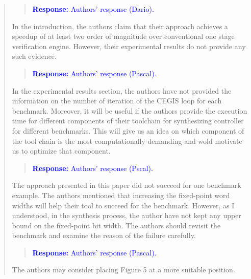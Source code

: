 \documentclass[11pt]{article}
\begin{document}
\begin{quote}
\begin{quote}
\textcolor{blue}{\textbf{Response:} Authors' response (Dario).}
\end{quote}

In the introduction, the authors claim that their approach achieves a speedup of at least two order of magnitude over conventional one stage verification engine. However, their experimental results do not provide any such evidence.

\begin{quote}
\textcolor{blue}{\textbf{Response:} Authors' response (Pascal).}
\end{quote}

In the experimental results section, the authors have not provided the information on the number of iteration of the CEGIS loop for each benchmark. Moreover, it will be useful if the authors provide the execution time for different components of their toolchain for synthesizing controller for different benchmarks. This will give us an idea on which component of the tool chain is the most computationally demanding and wold motivate us to optimize that component.

\begin{quote}
\textcolor{blue}{\textbf{Response:} Authors' response (Pscal).}
\end{quote}

The approach presented in this paper did not succeed for one benchmark example. The authors mentioned that increasing the fixed-point word widths will help their tool to succeed for the benchmark. However, as I understood, in the synthesis process, the author have not kept any upper bound on the fixed-point bit width. The authors should revisit the benchmark and examine the reason of the failure carefully.

\begin{quote}
\textcolor{blue}{\textbf{Response:} Authors' response (Pascal).}
\end{quote}

The authors may consider placing Figure 5 at a more suitable position.

\end{quote}



\newpage
\end{document}
